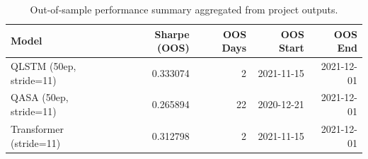 \begin{table}[ht]
\centering
\begin{tabular}{lrrrr}
\hline
Model & Sharpe (OOS) & OOS Days & OOS Start & OOS End \\
\hline
QLSTM (50ep, stride=11) & 0.333074 & 2 & 2021-11-15 & 2021-12-01 \\
QASA (50ep, stride=11) & 0.265894 & 22 & 2020-12-21 & 2021-12-01 \\
Transformer (stride=11) & 0.312798 & 2 & 2021-11-15 & 2021-12-01 \\
\hline
\end{tabular}
\caption{Out-of-sample performance summary aggregated from project outputs.}
\label{tab:oos_summary}
\end{table}


